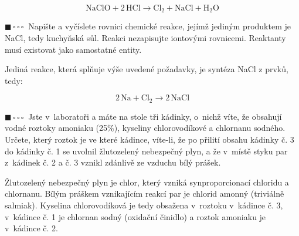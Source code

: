\documentclass{book}
\newcommand{\jeden}{$\blacksquare \, \square \, \square \, \square \; \; $}
\renewenvironment{quotation}{\par}{\par} %
\begin{document}
\[
\mathrm{NaClO+2\,HCl\rightarrow Cl_{2}+NaCl+H_{2}O}
\]


\hrulefill %
\begin{quotation}
\jeden Napište a vyčíslete rovnici chemické reakce, jejímž jediným produktem
je NaCl, tedy kuchyňská sůl. Reakci nezapisujte iontovými rovnicemi.
Reaktanty musí existovat jako samostatné entity.
\end{quotation} \dotfill \par 
Jediná reakce, která splňuje výše uvedené požadavky, je syntéza NaCl
z prvků, tedy:

\[
\mathrm{2\,Na+Cl_{2}\rightarrow2\,NaCl}
\]


\hrulefill %
\begin{quotation}
\jeden Jste v~laboratoři a máte na stole tři kádinky, o~nichž víte, že obsahují
vodné roztoky amoniaku (25\%), kyseliny chlorovodíkové a chlornanu
sodného. Určete, který roztok je ve které kádince, víte-li, že po
přilití obsahu kádinky č. 3 do kádinky č. 1 se uvolnil žlutozelený
nebezpečný plyn, a že v~místě styku par z~kádinek č. 2 a č. 3 vznikl zdánlivě ze vzduchu bílý prášek.
\end{quotation} \dotfill \par 
Žlutozelený nebezpečný plyn je chlor, který vzniká synproporcionací
chloridu a chlornanu. Bílým práškem vznikajícím reakcí par je chlorid
amonný (triviálně salmiak). Kyselina chlorovodíková je tedy obsažena
v~roztoku v~kádince č. 3, v~kádince č. 1 je chlornan sodný (oxidační
činidlo) a roztok amoniaku je v~kádince č. 2. 
\end{document}
